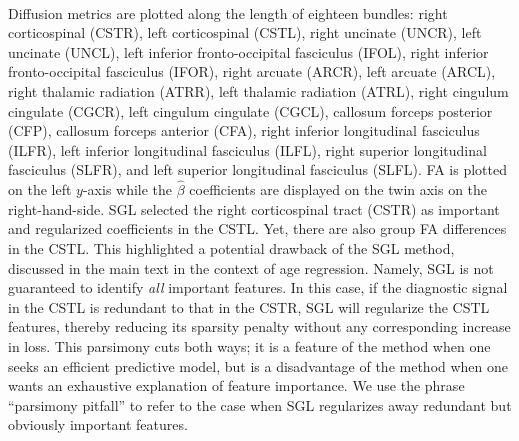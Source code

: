 \documentclass[10pt,letterpaper]{article}
\begin{document}
\paragraph{}
\label{S1_Fig}
Diffusion metrics are plotted
along the length of eighteen bundles:
right corticospinal (CSTR),
left corticospinal (CSTL),
right uncinate (UNCR),
left uncinate (UNCL),
left inferior fronto-occipital fasciculus (IFOL),
right inferior fronto-occipital fasciculus (IFOR),
right arcuate (ARCR),
left arcuate (ARCL),
right thalamic radiation (ATRR),
left thalamic radiation (ATRL),
right cingulum cingulate (CGCR),
left cingulum cingulate (CGCL),
callosum forceps posterior (CFP),
callosum forceps anterior (CFA),
right inferior longitudinal fasciculus (ILFR),
left inferior longitudinal fasciculus (ILFL),
right superior longitudinal fasciculus (SLFR),
and left superior longitudinal fasciculus (SLFL).
FA is plotted on the left $y$-axis while the $\hat{\beta}$ coefficients are displayed on the twin axis on the right-hand-side. SGL selected
the right corticospinal tract (CSTR) as important and regularized coefficients
in the CSTL. Yet, there are also group FA differences in the
CSTL. This highlighted a potential drawback of the SGL method, discussed in the
main text in the context of age regression. Namely, SGL is not guaranteed to
identify \emph{all} important features. In this case, if the diagnostic signal
in the CSTL is redundant to that in the CSTR, SGL will regularize the CSTL
features, thereby reducing its sparsity penalty without any corresponding
increase in loss. This parsimony cuts both ways; it is a feature of the method
when one seeks an efficient predictive model, but is a disadvantage of the
method when one wants an exhaustive explanation of feature importance. We use the phrase ``parsimony pitfall'' to refer to the case when SGL regularizes
away redundant but obviously important features.

\paragraph*{}
\label{S2_Fig}
\end{document}
